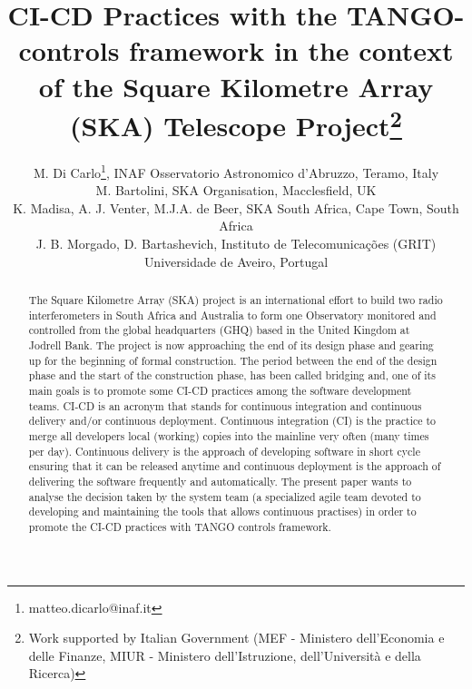 \documentclass[a4paper,
               keeplastbox,   %
               ]{jacow}
\begin{document}
\title{CI-CD Practices with the TANGO-controls framework in the context of the Square Kilometre Array (SKA) Telescope Project\thanks{Work supported by Italian Government (MEF - Ministero dell'Economia e delle Finanze, MIUR - Ministero dell'Istruzione, dell'Università e della Ricerca)}}

\author{M. Di Carlo\thanks{matteo.dicarlo@inaf.it}, INAF Osservatorio Astronomico d'Abruzzo, Teramo, Italy \\
		M. Bartolini, SKA Organisation, Macclesfield, UK \\
		K. Madisa, A. J. Venter, M.J.A. de Beer, SKA South Africa, Cape Town, South Africa \\
		J. B. Morgado, D. Bartashevich, Instituto de Telecomunicações (GRIT) \\ 
		Universidade de Aveiro, Portugal}
\maketitle

%
\begin{abstract}
  The Square Kilometre Array (SKA) project is an international effort to build two radio interferometers in South Africa and Australia to form one Observatory monitored and controlled from the global headquarters (GHQ) based in the United Kingdom at Jodrell Bank. The project is now approaching the end of its design phase and gearing up for the beginning of formal construction. The period between the end of the design phase and the start of the construction phase, has been called bridging and, one of its main goals is to promote some CI-CD practices among the software development teams. CI-CD is an acronym that stands for continuous integration and continuous delivery and/or continuous deployment. Continuous integration (CI) is the practice to merge all developers local (working) copies into the mainline very often (many times per day). Continuous delivery is the approach of developing software in short cycle ensuring that it can be released anytime and continuous deployment is the approach of delivering the software frequently and automatically. The present paper wants to analyse the decision taken by the system team (a specialized agile team devoted to developing and maintaining the tools that allows continuous practises) in order to promote the CI-CD practices with TANGO controls framework. 

\end{abstract}
\end{document}
